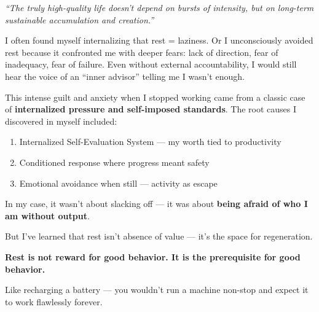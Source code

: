 \documentclass[11pt,a4paper]{article}
\begin{document}
\begin{tcolorbox}[colback=yellow!5,colframe=orange!60,title={\faBrain~Personal Reflection: Why I Struggled with Rest}]
\textit{``The truly high-quality life doesn't depend on bursts of intensity, but on long-term sustainable accumulation and creation.''}

\vspace{0.3em}
I often found myself internalizing that rest = laziness. Or I unconsciously avoided rest because it confronted me with deeper fears: lack of direction, fear of inadequacy, fear of failure. Even without external accountability, I would still hear the voice of an ``inner advisor'' telling me I wasn't enough.

\vspace{0.3em}
This intense guilt and anxiety when I stopped working came from a classic case of \textbf{internalized pressure and self-imposed standards}. The root causes I discovered in myself included:

\begin{enumerate}[leftmargin=1.5em]
    \item Internalized Self-Evaluation System — my worth tied to productivity
    \item Conditioned response where progress meant safety
    \item Emotional avoidance when still — activity as escape
\end{enumerate}

In my case, it wasn't about slacking off — it was about \textbf{being afraid of who I am without output}.

\vspace{0.5em}
But I've learned that rest isn't absence of value — it's the space for regeneration.

\vspace{0.5em}
\begin{center}
\colorbox{yellow!20}{\parbox{0.9\textwidth}{\centering\textbf{Rest is not reward for good behavior. It is the prerequisite for good behavior.}}}
\end{center}
\vspace{0.5em}

Like recharging a battery — you wouldn't run a machine non-stop and expect it to work flawlessly forever.
\end{tcolorbox}
\end{document}
